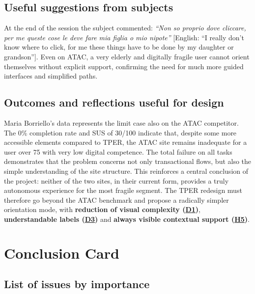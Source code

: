 ﻿\documentclass[11pt,a4paper]{article}
\begin{document}
\subsection*{Useful suggestions from subjects}
\begin{tcolorbox}[base]
At the end of the session the subject commented:
\textit{``Non so proprio dove cliccare, per me queste cose le deve fare mia figlia o mio nipote''} [English: ``I really don't know where to click, for me these things have to be done by my daughter or grandson''].
Even on ATAC, a very elderly and digitally fragile user cannot orient themselves without explicit support, confirming the need for much more guided interfaces and simplified paths.
\end{tcolorbox}

\subsection*{Outcomes and reflections useful for design}
\begin{tcolorbox}[base]
Maria Borriello's data represents the limit case also on the ATAC competitor. The 0\% completion rate and SUS of 30/100 indicate that, despite some more accessible elements compared to TPER, the ATAC site remains inadequate for a user over 75 with very low digital competence. The total failure on all tasks demonstrates that the problem concerns not only transactional flows, but also the simple understanding of the site structure. This reinforces a central conclusion of the project: neither of the two sites, in their current form, provides a truly autonomous experience for the most fragile segment. The TPER redesign must therefore go beyond the ATAC benchmark and propose a radically simpler orientation mode, with \textbf{reduction of visual complexity (\hyperref[atac:D1]{D1})}, \textbf{understandable labels (\hyperref[atac:D3]{D3})} and \textbf{always visible contextual support (\hyperref[atac:H5]{H5})}.
\end{tcolorbox}



\newpage

\section{Conclusion Card}

\subsection*{List of issues by importance}
\end{document}
